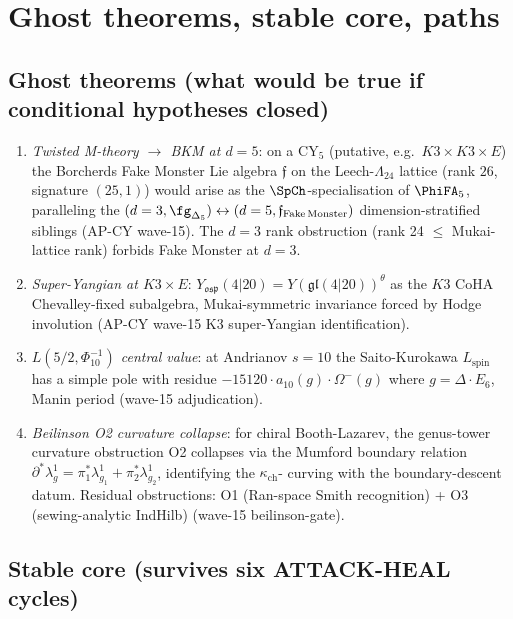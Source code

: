 \section{Ghost theorems, stable core, paths}
\label{sec:agent12-ghost-theorems}

\subsection*{Ghost theorems (what would be true if conditional
hypotheses closed)}

\begin{enumerate}
\item \emph{Twisted M-theory $\to$ BKM at $d = 5$}: on a CY$_5$
(putative, e.g.\ $K3 \times K3 \times E$) the Borcherds Fake Monster
Lie algebra $\mathfrak{f}$ on the Leech-$\Lambda_{24}$ lattice
(rank $26$, signature $(25, 1)$) would arise as the
$\SpCh$-specialisation of $\PhiFA_5$, paralleling the
$(d = 3, \fg_{\Delta_5}) \leftrightarrow
(d = 5, \mathfrak{f}_{\mathrm{Fake\,Monster}})$ dimension-stratified
siblings (AP-CY wave-15). The $d = 3$ rank obstruction (rank 24
$\leq$ Mukai-lattice rank) forbids Fake Monster at $d = 3$.
\item \emph{Super-Yangian at $K3 \times E$}: $Y_{\mathfrak{osp}}(4 | 20)
= Y(\mathfrak{gl}(4|20))^\theta$ as the $K3$ CoHA Chevalley-fixed
subalgebra, Mukai-symmetric invariance forced by Hodge involution
(AP-CY wave-15 K3 super-Yangian identification).
\item \emph{$L(5/2, \Phi_{10}^{-1})$ central value}: at Andrianov
$s = 10$ the Saito-Kurokawa $L_{\mathrm{spin}}$ has a simple pole with
residue $-15120 \cdot a_{10}(g) \cdot \Omega^-(g)$ where
$g = \Delta \cdot E_6$, Manin period (wave-15 adjudication).
\item \emph{Beilinson O2 curvature collapse}: for chiral Booth-Lazarev,
the genus-tower curvature obstruction O2 collapses via the Mumford
boundary relation $\partial^* \lambda_g^1 = \pi_1^* \lambda_{g_1}^1
+ \pi_2^* \lambda_{g_2}^1$, identifying the $\kappa_{\mathrm{ch}}$-
curving with the boundary-descent datum. Residual obstructions:
O1 (Ran-space Smith recognition) + O3 (sewing-analytic IndHilb)
(wave-15 beilinson-gate).
\end{enumerate}

\subsection*{Stable core (survives six ATTACK-HEAL cycles)}

